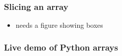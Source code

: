 \documentclass[14pt]{beamer}
\begin{document}

\begin{frame}[fragile]

\frametitle{Slicing an array}

\begin{itemize}
	\item needs a figure showing boxes
\end{itemize}

\end{frame}


\begin{frame}[fragile]
\frametitle{Live demo of Python arrays}

\end{frame}

%
%
%
%
%
%
%
%
%
%
%
\end{document}
